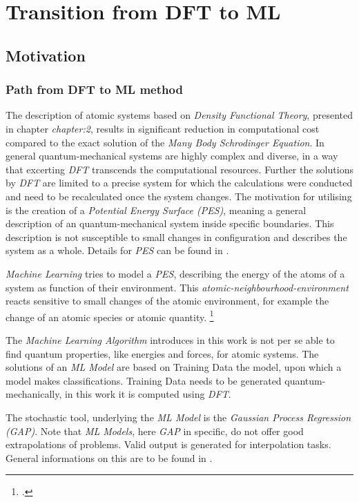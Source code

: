 \chapter{Transition from DFT to ML}
\label{chapter:3}
\section{Motivation}
\label{section:3.1}
\subsection{Path from DFT to ML method}
\label{subsection:3.1.1}
The description of atomic systems based on \textit{Density Functional Theory}, presented in chapter \textit{chapter:2}, results in significant reduction in computational cost compared to the exact solution of the \textit{Many Body Schrodinger Equation}. In general quantum-mechanical systems are highly complex and diverse, in a way that excerting \textit{DFT} transcends the computational resources. Further the solutions by \textit{DFT} are limited to a precise system for which the calculations were conducted and need to be recalculated once the system changes. The motivation for utilising   is the creation of a \textit{Potential Energy Surface (PES)}, meaning a general description of an quantum-mechanical system inside specific boundaries. This description is not susceptible to small changes in configuration and describes the system as a whole. Details for \textit{PES} can be found in \cite{PES}. 

\textit{Machine Learning} tries to model a \textit{PES}, describing the energy of the atoms of a system as function of their environment. This \textit{atomic-neighbourhood-environment} reacts sensitive to small changes of the atomic environment, for example the change of an atomic species or atomic quantity.  \footcite[1051]{GAP-intro}

The \textit{Machine Learning Algorithm} introduces in this work is not per se able to find quantum properties, like energies and forces, for atomic systems. The solutions of an \textit{ML Model} are based on Training Data the model, upon which a model makes classifications. Training Data needs to be generated quantum-mechanically, in this work it is computed using \textit{DFT}. 

The stochastic tool, underlying the \textit{ML Model} is the \textit{Gaussian Process Regression (GAP)}. Note that \textit{ML Models}, here \textit{GAP} in specific, do not offer good extrapolations of problems. Valid output is generated for interpolation tasks. General informations on this are to be found in \cite{GAP-info-theory}. 

